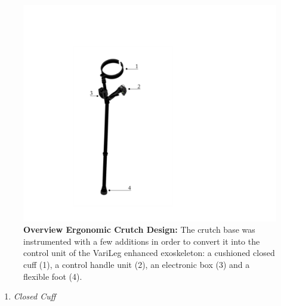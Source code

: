 \documentclass[conference,a4paper]{IEEEtran}
\begin{document}
\begin{figure}[!t]
	\centering
	\includegraphics[width=1.5\columnwidth]{Images/Results/ergonomic_crutch.png}
	\caption{\textbf{Overview Ergonomic Crutch Design:} The crutch base was instrumented with a few additions in order to convert it into the control unit of the VariLeg enhanced exoskeleton: a cushioned closed cuff (1), a control handle unit (2), an electronic box (3) and a flexible foot (4).}
	\label{ergonomic_crutch}
\end{figure}

\begin{enumerate}[\textit{(1)}]
    \item{\textit{Closed Cuff}}
\end{enumerate}
\end{document}
